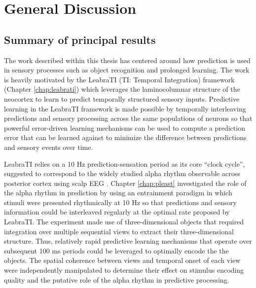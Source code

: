 \documentclass[dwyatte_dissertation.tex]{subfiles}
\begin{document}
\sloppy

\chapter{General Discussion}
\label{chap:discuss}

\section{Summary of principal results}
The work described within this thesis has centered around how prediction is used in sensory processes such as object recognition and prolonged learning. The work is heavily motivated by the LeabraTI (TI: Temporal Integration) framework (Chapter \ref{chap:leabrati}) which leverages the laminocolumnar structure of the neocortex \cite{Mountcastle97,BuxhoevedenCasanova02,HortonAdams05} to learn to predict temporally structured sensory inputs. Predictive learning in the LeabraTI framework is made possible by temporally interleaving predictions and sensory processing across the same populations of neurons so that powerful error-driven learning mechanisms \cite{OReillyMunakata00,OReillyMunakataFrankEtAl12} can be used to compute a prediction error that can be learned against to minimize the difference between predictions and sensory events over time.

LeabraTI relies on a 10 Hz prediction-sensation period as its core ``clock cycle'', suggested to correspond to the widely studied alpha rhythm observable across posterior cortex using scalp EEG \cite{PalvaPalva07,HanslmayrGrossKlimeschEtAl11,VanRullenBuschDrewesEtAl11}. Chapter \ref{chap:pleast} investigated the role of the alpha rhythm in prediction by using an entrainment paradigm \cite{SchroederLakatosKajikawaEtAl08,CalderoneLakatosButlerEtAlInPress} in which stimuli were presented rhythmically at 10 Hz so that predictions and sensory information could be interleaved regularly at the optimal rate proposed by LeabraTI. The experiment made use of three-dimensional objects that required integration over multiple sequential views to extract their three-dimensional structure. Thus, relatively rapid predictive learning mechanisms that operate over subsequent 100 ms periods could be leveraged to optimally encode the the objects. The spatial coherence between views and temporal onset of each view were independently manipulated to determine their effect on stimulus encoding quality and the putative role of the alpha rhythm in predictive processing.
\end{document}

